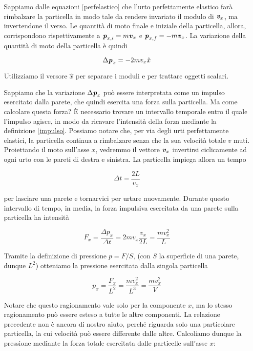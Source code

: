 Sappiamo dalle equazioni \ref{perfelastico} che l'urto perfettamente
elastico farà rimbalzare la particella in modo tale da rendere
invariato il modulo di $\textbf{\textit{v}}_x$, ma invertendone il verso.
Le quantità di moto finale e iniziale della particella, allora,
corrispondono rispettivamente a $\textbf{\textit{p}}_{x,i} = m\textbf{\textit{v}}_x$
e $\textbf{\textit{p}}_{x,f} = -m\textbf{\textit{v}}_x$. La variazione della quantità
di moto della particella è quindi

\[ \Delta\textbf{\textit{p}}_x = -2mv_x \hat{x} \]

\noindent Utilizziamo il versore $\hat{x}$ per separare i moduli e per trattare
oggetti scalari.

Sappiamo che la variazione $\Delta\textbf{\textit{p}}_x$ può essere interpretata
come un impulso esercitato dalla parete, che quindi esercita una forza
sulla particella. Ma come calcolare questa forza? È necessario trovare
un intervallo temporale entro il quale l'impulso agisce, in modo da
ricavare l'intensità della forza mediante la definizione \ref{impulso}.
Possiamo notare che, per via degli urti perfettamente elastici, la particella
continua a rimbalzare senza che la sua velocità totale $v$ muti.
Proiettando il moto sull'asse $x$, vedremmo il vettore $\textbf{\textit{v}}_x$
invertirsi ciclicamente ad ogni urto con le pareti di destra e sinistra.
La particella impiega allora un tempo

\[ \Delta t = \frac{2L}{v_x} \]

\noindent per lasciare una parete e tornarvici per urtare nuovamente.
Durante questo intervallo di tempo, in media, la forza impulsiva
esercitata da una parete sulla particella ha intensità

\[ F_x = \frac{\Delta p_x}{\Delta t} = 2mv_x \frac{v_x}{2L} = \frac{mv_x^2}{L} \]

\noindent Tramite la definizione di pressione $p = F/S$, (con $S$ la
superficie di una parete, dunque $L^2$) otteniamo la
pressione esercitata dalla singola particella

\[ p_x = \frac{F_x}{L^2} = \frac{mv_x^2}{L^3} = \frac{mv_x^2}{V} \]

\noindent Notare che questo ragionamento vale solo per la componente
$x$, ma lo stesso ragionamento può essere esteso a tutte le altre
componenti. La relazione precedente non è ancora di nostro aiuto,
perché riguarda solo una particolare particella, la cui velocità può
essere differente dalle altre. Calcoliamo dunque la pressione mediante
la forza totale esercitata dalle particelle sull'asse $x$:

